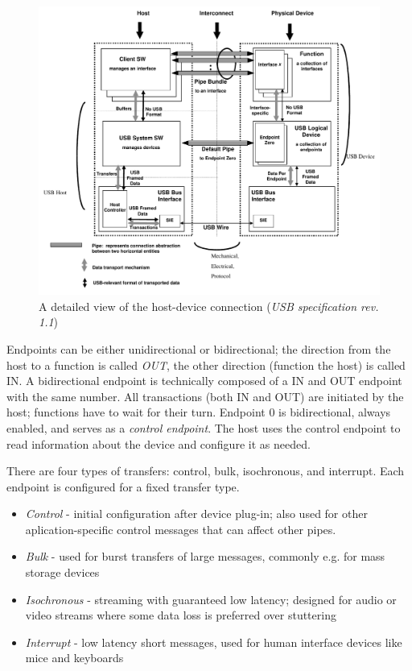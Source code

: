 \begin{figure}[H]
	\centering
	\includegraphics[width=\textwidth] {img/usb-structure.png}
	\caption{\label{fig:usb-logical}A detailed view of the host-device connection (\textit{USB specification rev. 1.1})}
\end{figure}

Endpoints can be either unidirectional or bidirectional; the direction from the host to a function is called \textit{OUT}, the other direction (function the host) is called IN. A bidirectional endpoint is technically composed of a IN and OUT endpoint with the same number. All transactions (both IN and OUT) are initiated by the host; functions have to wait for their turn. Endpoint 0 is bidirectional, always enabled, and serves as a \textit{control endpoint}. The host uses the control endpoint to read information about the device and configure it as needed.

There are four types of transfers: control, bulk, isochronous, and interrupt. Each endpoint is configured for a fixed transfer type. 

\begin{itemize}
	\item \textit{Control} - initial configuration after device plug-in; also used for other aplication-specific control messages that can affect other pipes.
	\item \textit{Bulk} - used for burst transfers of large messages, commonly e.g. for mass storage devices
	\item \textit{Isochronous} - streaming with guaranteed low latency; designed for audio or video streams where some data loss is preferred over stuttering
	\item \textit{Interrupt} - low latency short messages, used for human interface devices like mice and keyboards
\end{itemize}

